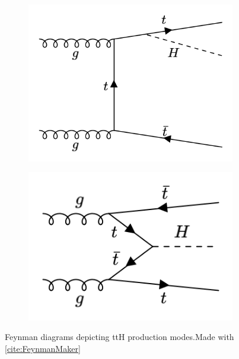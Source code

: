 \begin{figure}[htp]
\begin{subfigure}[b]{0.3\textwidth}
         \includegraphics[width=\textwidth]{figures/theory_chapter/ttH3.png}
         \label{fig:ttH3}
     \end{subfigure}
     \hfill
         \begin{subfigure}[b]{0.3\textwidth}
         \centering
         \includegraphics[width=\textwidth]{figures/theory_chapter/ttH4.png}
         \label{fig:ttH4}
     \end{subfigure}
     \hfill 
  \label{fig:loopmodes}
  \caption{Feynman diagrams depicting ttH production modes.Made with \ref{cite:FeynmanMaker}}  
\end{figure}

